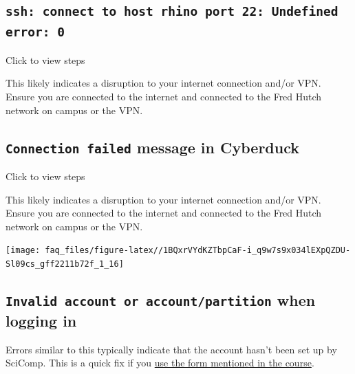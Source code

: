 \documentclass[
]{book}
\begin{document}
\hypertarget{ssh-connect-to-host-rhino-port-22-undefined-error-0}{%
\subsection*{\texorpdfstring{\texttt{ssh:\ connect\ to\ host\ rhino\ port\ 22:\ Undefined\ error:\ 0}}{ssh: connect to host rhino port 22: Undefined error: 0}}\label{ssh-connect-to-host-rhino-port-22-undefined-error-0}}

Click to view steps

This likely indicates a disruption to your internet connection and/or VPN. Ensure you are connected to the internet and connected to the Fred Hutch network on campus or the VPN.

\hypertarget{connection-failed-message-in-cyberduck}{%
\subsection*{\texorpdfstring{\texttt{Connection\ failed} message in Cyberduck}{Connection failed message in Cyberduck}}\label{connection-failed-message-in-cyberduck}}

Click to view steps

This likely indicates a disruption to your internet connection and/or VPN. Ensure you are connected to the internet and connected to the Fred Hutch network on campus or the VPN.

\texttt{[image: faq\_files/figure-latex//1BQxrVYdKZTbpCaF-i\_q9w7s9x034lEXpQZDU-Sl09cs\_gff2211b72f\_1\_16]}

\hypertarget{invalid-account-or-accountpartition-when-logging-in}{%
\subsection*{\texorpdfstring{\texttt{Invalid\ account\ or\ account/partition} when logging in}{Invalid account or account/partition when logging in}}\label{invalid-account-or-accountpartition-when-logging-in}}

Errors similar to this typically indicate that the account hasn't been set up by SciComp. This is a quick fix if you \href{account-setup.html\#pi-account}{use the form mentioned in the course}.
\end{document}

